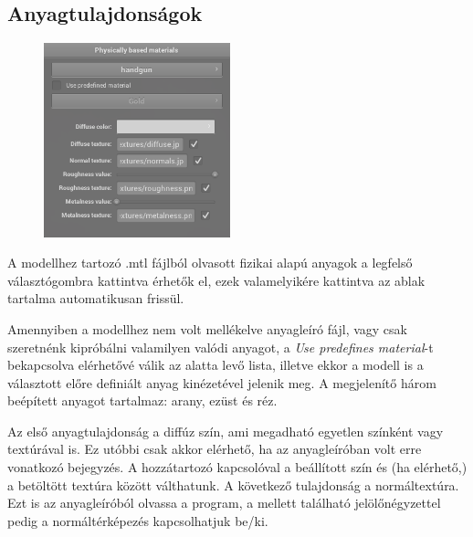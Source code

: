 \clearpage

\subsection{Anyagtulajdonságok}

\begin{figure}
    \vspace{-23pt}
    \includegraphics[width=0.48\textwidth]{images/pbr_materials.png}
    \vspace{-20pt}
\end{figure}

A modellhez tartozó .mtl fájlból olvasott fizikai alapú anyagok a legfelső választógombra kattintva érhetők el, ezek valamelyikére kattintva az ablak tartalma automatikusan frissül.

Amennyiben a modellhez nem volt mellékelve anyagleíró fájl, vagy csak szeretnénk kipróbálni valamilyen valódi anyagot, a \textit{Use predefines material}-t bekapcsolva elérhetővé válik az alatta levő lista, illetve ekkor a modell is a választott előre definiált anyag kinézetével jelenik meg. A megjelenítő három beépített anyagot tartalmaz: arany, ezüst és réz.

Az első anyagtulajdonság a diffúz szín, ami megadható egyetlen színként vagy textúrával is. Ez utóbbi csak akkor elérhető, ha az anyagleíróban volt erre vonatkozó bejegyzés. A hozzátartozó kapcsolóval a beállított szín és (ha elérhető,) a betöltött textúra között válthatunk. A következő tulajdonság a normáltextúra. Ezt is az anyagleíróból olvassa a program, a mellett található jelölőnégyzettel pedig a normáltérképezés kapcsolhatjuk be/ki.

